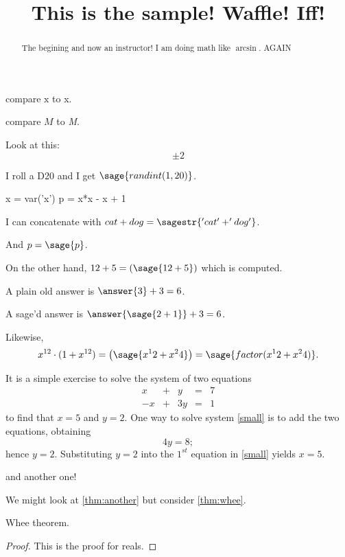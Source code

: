 \documentclass{ximera}
\title[Breal-grond]{This is the sample! Waffle!  Iff!}
\begin{document}
\begin{abstract}
  The begining and now an instructor! I am doing math like $\arcsin$. AGAIN
\end{abstract}

\maketitle

compare $\mathrm{x}$ to x.

compare $M$ to \textit{M}.

Look at this:
\[
  \pm 2
\]

I roll a D20 and I get $\sage{randint(1,20)}$.

\begin{sagesilent}
x = var('x')
p = x*x - x + 1
\end{sagesilent}

I can concatenate with $cat + dog = \sagestr{'cat' + 'dog'}$.

And $p = \sage{p}$.

On the other hand, $12 + 5 = \left( \sage{12+5} \right)$ which is computed.

\begin{problem}
  A plain old answer is $\answer{3} + 3 = 6$.

  A sage'd answer is $\answer{\sage{2+1}} + 3 = 6$.
\end{problem}

Likewise,
\[
  x^{12} \cdot (1 + x^{12}) = \left(\sage{x^12 + x^24}\right) = \sage{factor(x^12 + x^24)}.
\]

It is a simple exercise to solve the system of two equations
\begin{equation} \label{small}
\begin{array}{rcrcr}
 x & + & y & = & 7 \\
-x & + & 3y & = & 1
\end{array}
\end{equation}
to find that $x=5$ and $y=2$.  One way to solve
system \eqref{small} is to add the two equations, obtaining
\[
4y=8;
\]
hence $y=2$.  Substituting $y=2$ into the $1^{st}$ equation in
\ref{small} yields $x=5$.





and another one!



We might look at \ref{thm:another} but consider \ref{thm:whee}.

\begin{theorem}
  \label{thm:whee}  Whee theorem.
\end{theorem}
\begin{proof}
This is the proof for reals.
\end{proof}
\end{document}
